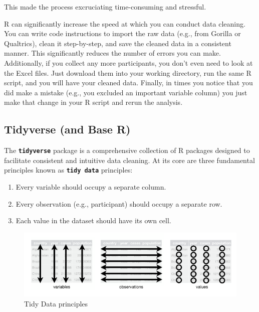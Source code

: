 \documentclass[
]{book}
\begin{document}
This made the process excruciating time-consuming and stressful.

R can significantly increase the speed at which you can conduct data cleaning. You can write code instructions to import the raw data (e.g., from Gorilla or Qualtrics), clean it step-by-step, and save the cleaned data in a consistent manner. This significantly reduces the number of errors you can make. Additionally, if you collect any more participants, you don't even need to look at the Excel files. Just download them into your working directory, run the same R script, and you will have your cleaned data. Finally, in times you notice that you did make a mistake (e.g., you excluded an important variable column) you just make that change in your R script and rerun the analysis.

\hypertarget{tidyverse-and-base-r}{%
\subsection{Tidyverse (and Base R)}\label{tidyverse-and-base-r}}

The \textbf{\texttt{tidyverse}} package is a comprehensive collection of R packages designed to facilitate consistent and intuitive data cleaning. At its core are three fundamental principles known as \textbf{\texttt{tidy\ data}} principles:

\begin{enumerate}
\def\labelenumi{\arabic{enumi}.}
\item
  Every variable should occupy a separate column.
\item
  Every observation (e.g., participant) should occupy a separate row.
\item
  Each value in the dataset should have its own cell.
\end{enumerate}

\begin{figure}
\centering
\includegraphics{img/05-tidy-principles.PNG}
\caption{\label{fig:unnamed-chunk-170}Tidy Data principles}
\end{figure}
\end{document}
